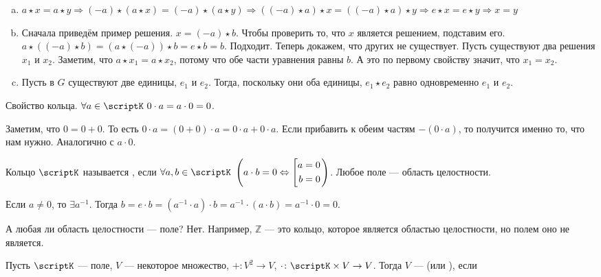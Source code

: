 \documentclass{article}
\begin{document}
\begin{itemize}
\begin{Proof}
\begin{enumerate}[a.]
                \item $a\star x=a\star y\Rightarrow(-a)\star(a\star x)=(-a)\star(a\star y)\Rightarrow((-a)\star a)\star x=((-a)\star a)\star y\Rightarrow e\star x=e\star y\Rightarrow x=y$
                \item Сначала приведём пример решения. $x=(-a)\star b$. Чтобы проверить то, что $x$ является решением, подставим его. $a\star((-a)\star b)=(a\star(-a))\star b=e\star b=b$. Подходит. Теперь докажем, что других не существует. Пусть существуют два решения $x_1$ и $x_2$. Заметим, что $a\star x_1=a\star x_2$, потому что обе части уравнения равны $b$. А это по первому свойству значит, что $x_1=x_2$.
                \item Пусть в $G$ существуют две единицы, $e_1$ и $e_2$. Тогда, поскольку они оба единицы, $e_1\star e_2$ равно одновременно $e_1$ и $e_2$.
            \end{enumerate}
        \end{Proof}
        \thm Свойство кольца. $\forall a\in\scriptK~0\cdot a=a\cdot0=0$.
        \begin{Proof}
            Заметим, что $0=0+0$. То есть $0\cdot a=(0+0)\cdot a=0\cdot a+0\cdot a$. Если прибавить к обеим частям $-(0\cdot a)$, то получится именно то, что нам нужно. Аналогично с $a\cdot0$.
        \end{Proof}
        \dfn Кольцо $\scriptK$ называется , если $\forall a,b\in\scriptK~\left(a\cdot b=0\Leftrightarrow\left[\begin{aligned}
            a=0\\
            b=0
        \end{aligned}\right.\right)$.
        \thm Любое поле --- область целостности.
        \begin{Proof}
            Если $a\neq0$, то $\exists a^{-1}$. Тогда $b=e\cdot b=(a^{-1}\cdot a)\cdot b=a^{-1}\cdot(a\cdot b)=a^{-1}\cdot0=0$.
        \end{Proof}
        \begin{Example}
            А любая ли область целостности --- поле? Нет. Например, $\mathbb Z$ --- это кольцо, которое является областью целостности, но полем оно не является.
        \end{Example}
        \dfn Пусть $\scriptK$ --- поле, $V$ --- некоторое множество, $+\colon V^2\to V$, $\cdot\colon\scriptK\times V\to V$. Тогда $V$ ---  (или ), если
        \begin{itemize}

\end{itemize}
\end{itemize}
\end{document}
